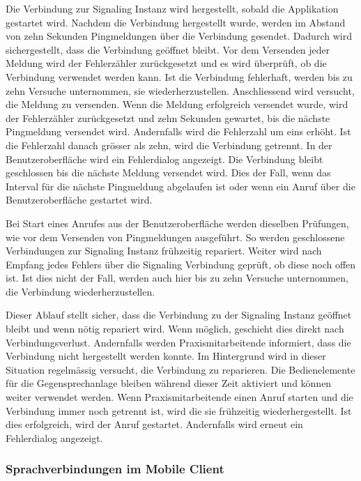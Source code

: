 Die Verbindung zur Signaling Instanz wird hergestellt, sobald die Applikation gestartet wird.
Nachdem die Verbindung hergestellt wurde, werden im Abstand von zehn Sekunden Pingmeldungen über die Verbindung gesendet.
Dadurch wird sichergestellt, dass die Verbindung geöffnet bleibt.
Vor dem Versenden jeder Meldung wird der Fehlerzähler zurückgesetzt und es wird überprüft, ob die Verbindung verwendet werden kann.
Ist die Verbindung fehlerhaft, werden bis zu zehn Versuche unternommen, sie wiederherzustellen.
Anschliessend wird versucht, die Meldung zu versenden.
Wenn die Meldung erfolgreich versendet wurde, wird der Fehlerzähler zurückgesetzt und zehn Sekunden gewartet, bis die nächste Pingmeldung versendet wird.
Andernfalls wird die Fehlerzahl um eins erhöht.
Ist die Fehlerzahl danach grösser als zehn, wird die Verbindung getrennt.
In der Benutzeroberfläche wird ein Fehlerdialog angezeigt.
Die Verbindung bleibt geschlossen bis die nächste Meldung versendet wird.
Dies der Fall, wenn das Interval für die nächste Pingmeldung abgelaufen ist oder wenn ein Anruf über die Benutzeroberfläche gestartet wird.

Bei Start eines Anrufes aus der Benutzeroberfläche werden dieselben Prüfungen, wie vor dem Versenden von Pingmeldungen ausgeführt.
So werden geschlossene Verbindungen zur Signaling Instanz frühzeitig repariert.
Weiter wird nach Empfang jedes Fehlers über die Signaling Verbindung geprüft, ob diese noch offen ist.
Ist dies nicht der Fall, werden auch hier bis zu zehn Versuche unternommen, die Verbindung wiederherzustellen.

Dieser Ablauf stellt sicher, dass die Verbindung zu der Signaling Instanz geöffnet bleibt und wenn nötig repariert wird.
Wenn möglich, geschieht dies direkt nach Verbindungsverlust.
Andernfalls werden Praxismitarbeitende informiert, dass die Verbindung nicht hergestellt werden konnte.
Im Hintergrund wird in dieser Situation regelmässig versucht, die Verbindung zu reparieren.
Die Bedienelemente für die Gegensprechanlage bleiben während dieser Zeit aktiviert und können weiter verwendet werden.
Wenn Praxismitarbeitende einen Anruf starten und die Verbindung immer noch getrennt ist, wird die sie frühzeitig wiederhergestellt.
Ist dies erfolgreich, wird der Anruf gestartet.
Andernfalls wird erneut ein Fehlerdialog angezeigt.

\clearpage

\subsubsection{Sprachverbindungen im Mobile Client}

